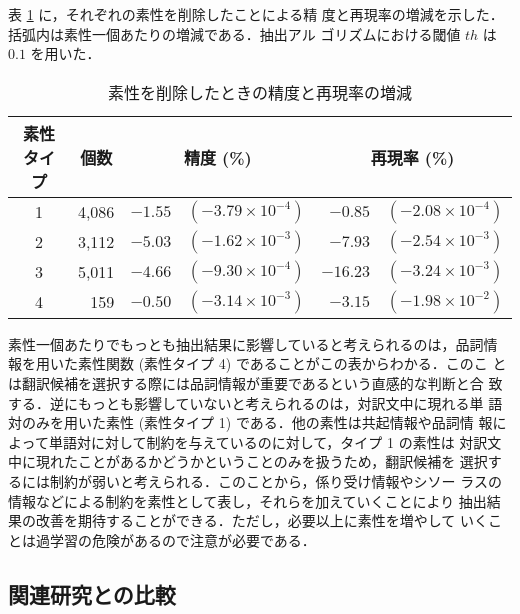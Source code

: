 表 \ref{tab:feature2} に，それぞれの素性を削除したことによる精
度と再現率の増減を示した．括弧内は素性一個あたりの増減である．抽出アル
ゴリズムにおける閾値 $th$ は $0.1$ を用いた．
\begin{table}[htbp]
  \centering
  \caption{素性を削除したときの精度と再現率の増減}
  \label{tab:feature2}
  \begin{tabular}{c|r|rr|rr} \hline
    \multicolumn{1}{c|}{素性タイプ} &
    \multicolumn{1}{c|}{個数} &
    \multicolumn{2}{c|}{精度 (\%)} &
    \multicolumn{2}{c}{再現率 (\%)} \\ \hline
    
    1 & 4,086 &
    $-1.55$ & $(-3.79 \times 10^{-4})$ &
    $-0.85$ & $(-2.08 \times 10^{-4})$ \\
    
    2 & 3,112 &
    $-5.03$ & $(-1.62 \times 10^{-3})$ &
    $-7.93$ & $(-2.54 \times 10^{-3})$ \\
    
    3 & 5,011 &
    $-4.66$ & $(-9.30 \times 10^{-4})$ &
    $-16.23$ & $(-3.24 \times 10^{-3})$ \\
    
    4 & 159 &
    $-0.50$ & $(-3.14 \times 10^{-3})$ &
    $-3.15$ & $(-1.98 \times 10^{-2})$ \\ \hline
  \end{tabular}
\end{table}

素性一個あたりでもっとも抽出結果に影響していると考えられるのは，品詞情
報を用いた素性関数 (素性タイプ 4) であることがこの表からわかる．このこ
とは翻訳候補を選択する際には品詞情報が重要であるという直感的な判断と合
致する．逆にもっとも影響していないと考えられるのは，対訳文中に現れる単
語対のみを用いた素性 (素性タイプ 1) である．他の素性は共起情報や品詞情
報によって単語対に対して制約を与えているのに対して，タイプ 1 の素性は
対訳文中に現れたことがあるかどうかということのみを扱うため，翻訳候補を
選択するには制約が弱いと考えられる．このことから，係り受け情報やシソー
ラスの情報などによる制約を素性として表し，それらを加えていくことにより
抽出結果の改善を期待することができる．ただし，必要以上に素性を増やして
いくことは過学習の危険があるので注意が必要である．

\subsection{関連研究との比較}
\label{sec:related}

